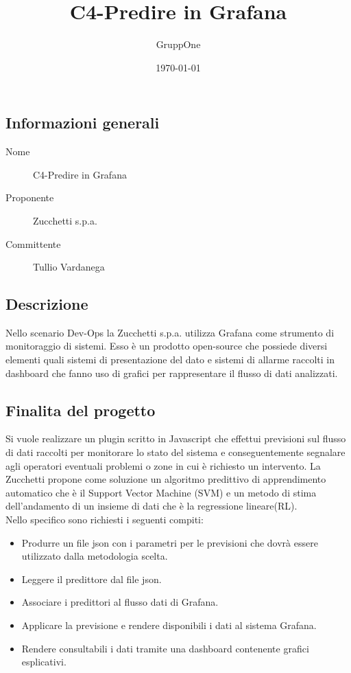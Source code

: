 \documentclass[../studio-di-fattibilita.tex]{subfiles}
\title{C4-Predire in Grafana}
\author{GruppOne}
\date{\today}
\begin{document}
	\subsection{Informazioni generali}
	\label{sec:informazioni_generali}
	\begin{description}
		\item[Nome] C4-Predire in Grafana
		\item[Proponente] Zucchetti s.p.a.
		\item[Committente] Tullio Vardanega
	\end{description}
	\subsection{Descrizione}
	\label{sec:descrizione}
	Nello scenario Dev-Ops la Zucchetti s.p.a. utilizza Grafana come strumento di monitoraggio di sistemi. Esso è un prodotto open-source che possiede diversi elementi quali sistemi di presentazione del dato e sistemi di allarme raccolti in dashboard che fanno uso di grafici per rappresentare il flusso di dati analizzati.
	
	\subsection{Finalita del progetto}
	\label{sec:finalita_del_progetto}
	Si vuole realizzare un plugin scritto in Javascript che effettui previsioni sul flusso di dati raccolti per monitorare lo stato del sistema e conseguentemente segnalare agli operatori eventuali problemi o zone in cui è richiesto un intervento. La Zucchetti propone come soluzione un algoritmo predittivo di apprendimento automatico che è il Support Vector Machine (SVM) e un metodo di stima dell'andamento di un insieme di dati che è la regressione lineare(RL).
	\\
	Nello specifico sono richiesti i seguenti compiti:
	\begin{itemize}
		\item Produrre un file json con i parametri per le previsioni che dovrà essere utilizzato dalla metodologia scelta.
		\item Leggere il predittore dal file json.
		\item Associare i predittori al flusso dati di Grafana.
		\item Applicare la previsione e rendere disponibili i dati al sistema Grafana.
		\item Rendere consultabili i dati tramite una dashboard contenente grafici esplicativi.
	\end{itemize}
	
\end{document}
